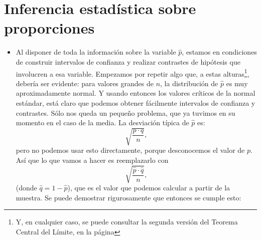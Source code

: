 \section{Inferencia estadística sobre proporciones}\label{sec:InferenciaEstadisticaSobreProporciones}

\begin{itemize}

    \item  Al disponer de toda la información sobre la variable $\hat p$, estamos en condiciones de construir intervalos de confianza y realizar contrastes de hipótesis que involucren a esa variable. Empezamos por repetir algo que, a estas alturas\footnote{Y, en cualquier caso, se puede consultar la segunda versión del Teorema Central del Límite, en la página \pageref{subsec:teoremaCentralLimiteSegundaVersion}}, debería ser evidente: para valores grandes de $n$, la distribución de $\hat p$ es muy aproximadamente normal. Y usando entonces los valores críticos de la normal estándar, está claro que podemos obtener fácilmente intervalos de confianza y contrastes. Sólo nos queda un pequeño problema, que ya tuvimos en su momento en el caso de la media. La desviación típica de $\hat p$ es:
        \[\sqrt{\dfrac{p\cdot q}{n}},\]
        pero no podemos usar esto directamente, porque desconocemos el valor de $p$. Así que lo que vamos a hacer es reemplazarlo con
        \[\sqrt{\dfrac{\hat p\cdot \hat q}{n}},\]
        (donde $\hat q=1-\hat p$), que es el valor que podemos calcular a partir de la muestra. Se puede demostrar rigurosamente que entonces se cumple esto:\\[3mm]
\end{itemize}
